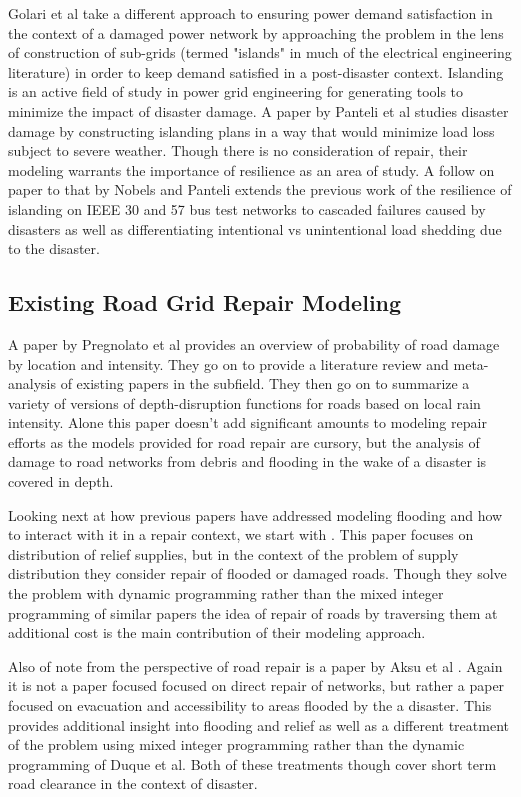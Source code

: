 \documentclass{article}
\begin{document}
		Golari et al\cite{GolariEA2014} take a different approach to ensuring power demand satisfaction in the context of a damaged power network by approaching the problem in the lens of construction of sub-grids (termed "islands" in much of the electrical engineering literature) in order to keep demand satisfied in a post-disaster context. Islanding is an active field of study in power grid engineering for generating tools to minimize the impact of disaster damage. A paper by Panteli et al\cite{Panteli2016} studies disaster damage by constructing islanding plans in a way that would minimize load loss subject to severe weather. Though there is no consideration of repair, their modeling warrants the importance of resilience as an area of study.  A follow on paper to that by Nobels and Panteli \cite{NobelsEA2019} extends the previous work of the resilience of islanding on IEEE 30 and 57 bus test networks to cascaded failures caused by disasters as well as differentiating intentional vs unintentional load shedding due to the disaster.
	\subsection{Existing Road Grid Repair Modeling}
		A paper by Pregnolato et al\cite{PregnolatoEA2017} provides an overview of probability of road damage by location and intensity. They go on to provide a literature review and meta-analysis of existing papers in the subfield. They then go on to summarize a variety of versions of depth-disruption functions for roads based on local rain intensity. Alone this paper doesn't add significant amounts to modeling repair efforts as the models provided for road repair are cursory, but the analysis of damage to road networks from debris and flooding in the wake of a disaster is covered in depth.
		
		Looking next at how previous papers have addressed modeling flooding and how to interact with it in a repair context, we start with \cite{DuqueEA2016}. This paper focuses on distribution of relief supplies, but in the context of the problem of supply distribution they consider repair of flooded or damaged roads. Though they solve the problem with dynamic programming rather than the mixed integer programming of similar papers the idea of repair of roads by traversing them at additional cost is the main contribution of their modeling approach.
		
		Also of note from the perspective of road repair is a paper by Aksu et al \cite{AksuEA2014}. Again it is not a paper focused focused on direct repair of networks, but rather a paper focused on evacuation and accessibility to areas flooded by the a disaster. This provides additional insight into flooding and relief as well as a different treatment of the problem using mixed integer programming rather than the dynamic programming of Duque et al. Both of these treatments though cover short term road clearance in the context of disaster. 
		
\end{document}
